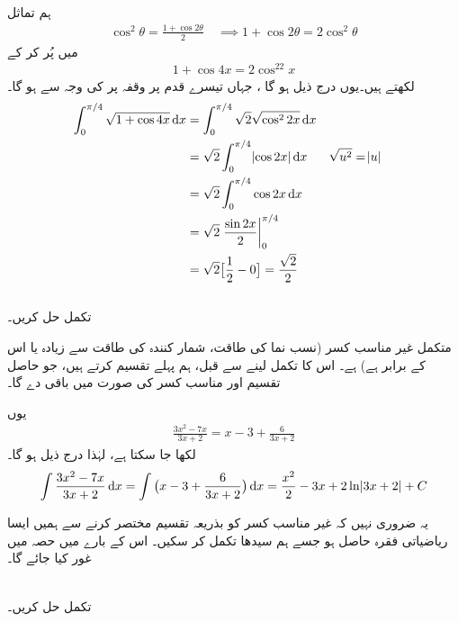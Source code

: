 ہم  تماثل
\begin{align*}
\cos^2\theta=\frac{1+\cos 2\theta}{2}\quad \implies 1+\cos 2\theta=2\cos^2\theta
\end{align*}
میں  پُر کر کے 
\begin{align*}
1+\cos 4x=2\cos^22x
\end{align*}
لکھتے ہیں۔یوں درج ذیل ہو گا ، جہاں تیسرے قدم پر وقفہ  پر  کی وجہ سے  ہو گا۔
\begin{align*}
\int_0^{\pi/4}\sqrt{1+\cos 4x}\dif x&=\int_0^{\pi/4}\sqrt{2}\sqrt{\cos^22x}\dif x\\
&=\sqrt{2}\int_0^{\pi/4}\abs{\cos 2x}\dif x&&\sqrt{u^2}=\abs{u}\\
&=\sqrt{2}\int_0^{\pi/4}\cos 2x\dif x\\
&=\sqrt{2}\left.\frac{\sin 2x}{2}\right\vert_0^{\pi/4}\\
&=\sqrt{2}\big[\frac{1}{2}-0\big]=\frac{\sqrt{2}}{2}
\end{align*}
\\
تکمل  حل کریں۔

متکمل غیر مناسب کسر (نسب نما کی طاقت، شمار کنندہ کی طاقت سے زیادہ یا اس کے برابر ہے)  ہے۔ اس کا تکمل لینے سے قبل، ہم پہلے تقسیم کرتے ہیں، جو  حاصل تقسیم اور  مناسب کسر کی صورت میں باقی   دے گا۔
\begin{center}
\end{center}
یوں
\begin{align*}
\frac{3x^2-7x}{3x+2}=x-3+\frac{6}{3x+2}
\end{align*}
لکھا جا سکتا ہے،  لہٰذا درج ذیل ہو گا۔
\begin{align*}
\int\frac{3x^2-7x}{3x+2}\dif x=\int\big(x-3+\frac{6}{3x+2}\big)\dif x=\frac{x^2}{2}-3x+2\ln\abs{3x+2}+C
\end{align*}

یہ ضروری نہیں  کہ غیر مناسب کسر کو بذریعہ تقسیم  مختصر  کرنے سے  ہمیں ایسا  ریاضیاتی فقرہ حاصل ہو جسے  ہم سیدھا تکمل کر سکیں۔ اس کے بارے میں حصہ   میں غور کیا جائے گا۔

\\
تکمل  حل کریں۔

